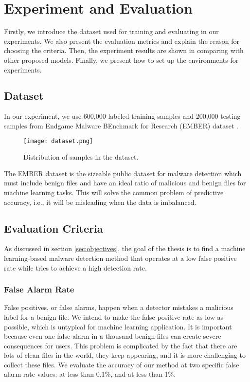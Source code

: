 \chapter{Experiment and Evaluation}
\graphicspath{{Chapter5/Figs/}}

\begin{chapabstract}
Firstly, we introduce the dataset used for training and evaluating in our experiments. We also present the evaluation metrics and explain the reason for choosing the criteria. Then, the experiment results are shown in comparing with other proposed models. Finally, we present how to set up the environments for experiments.
\end{chapabstract}

\section{Dataset}
\label{sec:dataset}

In our experiment, we use 600,000 labeled training samples and 200,000 testing samples from Endgame Malware BEnchmark for Research (EMBER) dataset \cite{anderson2018ember}.

\begin{figure}[H] 
\centering
\texttt{[image: dataset.png]}
\caption{Distribution of samples in the dataset.}
\label{fig:ember}
\end{figure}
 
The EMBER dataset is the sizeable public dataset for malware detection which must include benign files and have an ideal ratio of malicious and benign files for machine learning tasks. This will solve the common problem of predictive accuracy, i.e., it will be misleading when the data is imbalanced. 

\section{Evaluation Criteria}

As discussed in section \ref{sec:objectives}, the goal of the thesis is to find a machine learning-based malware detection method that operates at a low false positive rate while tries to achieve a high detection rate.

\subsection{False Alarm Rate}

False positives, or false alarms, happen when a detector mistakes a malicious label for a benign file. We intend to make the false positive rate as low as possible, which is untypical for machine learning application. It is important because even one false alarm in a thousand benign files can create severe consequences for users. This problem is complicated by the fact that there are lots of clean files in the world, they keep appearing, and it is more challenging to collect these files. We evaluate the accuracy of our method at two specific false alarm rate values: at less than 0.1\%, and at less than 1\%.

